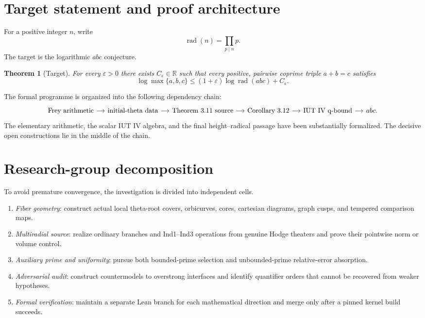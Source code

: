 \documentclass[11pt]{amsart}
\newtheorem{theorem}{Theorem}[section]
\theoremstyle{definition}
\theoremstyle{remark}
\newcommand{\R}{\mathbb R}
\newcommand{\eps}{\varepsilon}
\newcommand{\rad}{\operatorname{rad}}
\begin{document}
\tableofcontents

\section{Target statement and proof architecture}

For a positive integer $n$, write
\[
 \rad(n)=\prod_{p\mid n}p.
\]
The target is the logarithmic $abc$ conjecture.

\begin{theorem}[Target]\label{thm:abc-target}
For every $\eps>0$ there exists $C_{\eps}\in\R$ such that every positive,
pairwise coprime triple $a+b=c$ satisfies
\[
 \log \max\{a,b,c\}
 \le (1+\eps)\log\rad(abc)+C_{\eps}.
\]
\end{theorem}

The formal programme is organized into the following dependency chain:
\[
\begin{tikzcd}[column sep=small]
\text{Frey arithmetic}
 \arrow[r]
&\text{initial-theta data}
 \arrow[r]
&\text{Theorem 3.11 source}
 \arrow[r]
&\text{Corollary 3.12}
 \arrow[r]
&\text{IUT IV q-bound}
 \arrow[r]
&abc.
\end{tikzcd}
\]
The elementary arithmetic, the scalar IUT IV algebra, and the final
height--radical passage have been substantially formalized.  The decisive
open constructions lie in the middle of the chain.

\section{Research-group decomposition}

To avoid premature convergence, the investigation is divided into independent
cells.

\begin{enumerate}[label=\textbf{Cell \Alph*:},leftmargin=2.7em]
\item \emph{Fiber geometry}: construct actual local theta-root covers,
orbicurves, cores, cartesian diagrams, graph cusps, and tempered comparison
maps.
\item \emph{Multiradial source}: realize ordinary branches and Ind1--Ind3
operations from genuine Hodge theaters and prove their pointwise norm or
volume control.
\item \emph{Auxiliary prime and uniformity}: pursue both bounded-prime
selection and unbounded-prime relative-error absorption.
\item \emph{Adversarial audit}: construct countermodels to overstrong
interfaces and identify quantifier orders that cannot be recovered from
weaker hypotheses.
\item \emph{Formal verification}: maintain a separate Lean branch for each
mathematical direction and merge only after a pinned kernel build succeeds.
\end{enumerate}
\end{document}
